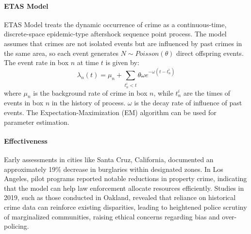 \documentclass{article}
\begin{document}
\paragraph{ETAS Model\cite{ETAS_ogata1988statistical}}
ETAS Model treats the dynamic occurrence of crime as a continuous-time, discrete-space epidemic-type aftershock sequence point process. The model assumes that crimes are not isolated events but are influenced by past crimes in the same area, so each event generates $N \sim Poisson(\theta)$ direct offspring events. The event rate in box $n$ at time $t$ is given by:
\begin{equation}
    \lambda_n(t) = \mu_n + \sum_{t_n^i < t} \theta \omega e^{-\omega (t - t_n^i)}
\end{equation}
where $\mu_n$ is the background rate of crime in box $n$, while $t_n^i$ are the times of events in box $n$ in the history of process. $\omega$ is the decay rate of influence of past events. The Expectation-Maximization (EM) algorithm can be used for parameter estimation\cite{lum_etas_em}. 



\paragraph{Effectiveness} Early assessments in cities like Santa Cruz, California, documented an approximately 19\% decrease in burglaries within designated zones. In Los Angeles, pilot programs reported notable reductions in property crime, indicating that the model can help law enforcement allocate resources efficiently. Studies in 2019, such as those conducted in Oakland, revealed that reliance on historical crime data can reinforce existing disparities, leading to heightened police scrutiny of marginalized communities, raising ethical concerns regarding bias and over-policing.
\end{document}
